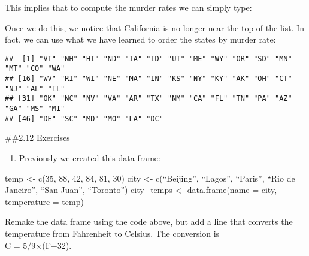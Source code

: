 \documentclass[
]{article}
\newenvironment{Shaded}{\begin{snugshade}}{\end{snugshade}}
\newcommand{\DecValTok}[1]{\textcolor[rgb]{0.00,0.00,0.81}{#1}}
\newcommand{\FunctionTok}[1]{\textcolor[rgb]{0.00,0.00,0.00}{#1}}
\newcommand{\NormalTok}[1]{#1}
\newcommand{\OtherTok}[1]{\textcolor[rgb]{0.56,0.35,0.01}{#1}}
\newcommand{\SpecialCharTok}[1]{\textcolor[rgb]{0.00,0.00,0.00}{#1}}
\providecommand{\tightlist}{%
  \setlength{\itemsep}{0pt}\setlength{\parskip}{0pt}}
\begin{document}
This implies that to compute the murder rates we can simply type:

\begin{Shaded}
\end{Shaded}

Once we do this, we notice that California is no longer near the top of
the list. In fact, we can use what we have learned to order the states
by murder rate:

\begin{Shaded}
\end{Shaded}

\begin{verbatim}
##  [1] "VT" "NH" "HI" "ND" "IA" "ID" "UT" "ME" "WY" "OR" "SD" "MN" "MT" "CO" "WA"
## [16] "WV" "RI" "WI" "NE" "MA" "IN" "KS" "NY" "KY" "AK" "OH" "CT" "NJ" "AL" "IL"
## [31] "OK" "NC" "NV" "VA" "AR" "TX" "NM" "CA" "FL" "TN" "PA" "AZ" "GA" "MS" "MI"
## [46] "DE" "SC" "MD" "MO" "LA" "DC"
\end{verbatim}

\#\#2.12 Exercises

\begin{enumerate}
\def\labelenumi{\arabic{enumi}.}
\tightlist
\item
  Previously we created this data frame:
\end{enumerate}

temp \textless- c(35, 88, 42, 84, 81, 30) city \textless- c(``Beijing'',
``Lagos'', ``Paris'', ``Rio de Janeiro'', ``San Juan'', ``Toronto'')
city\_temps \textless- data.frame(name = city, temperature = temp)

Remake the data frame using the code above, but add a line that converts
the temperature from Fahrenheit to Celsius. The conversion is\\
C = 5/9×(F−32).
\end{document}
